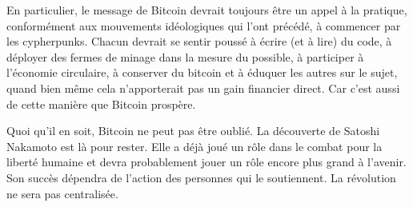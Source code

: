 En particulier, le message de Bitcoin devrait toujours être un appel à la pratique, conformément aux mouvements idéologiques qui l'ont précédé, à commencer par les cypherpunks. Chacun devrait se sentir poussé à écrire (et à lire) du code, à déployer des fermes de minage dans la mesure du possible, à participer à l'économie circulaire, à conserver du bitcoin et à éduquer les autres sur le sujet, quand bien même cela n'apporterait pas un gain financier direct. Car c'est aussi de cette manière que Bitcoin prospère.

Quoi qu'il en soit, Bitcoin ne peut pas être oublié. La découverte de Satoshi Nakamoto est là pour rester. Elle a déjà joué un rôle dans le combat pour la liberté humaine et devra probablement jouer un rôle encore plus grand à l'avenir. Son succès dépendra de l'action des personnes qui le soutiennent. La révolution ne sera pas centralisée.